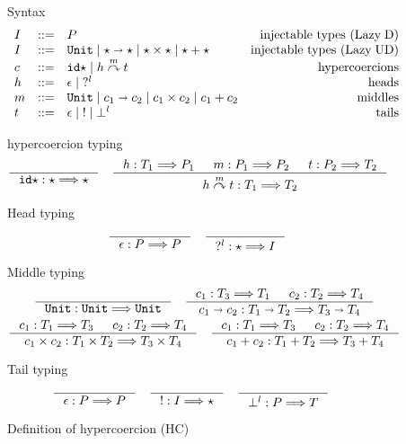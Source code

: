 \documentclass[acmsmall,review,anonymous]{acmart}\settopmatter{printfolios=true,printccs=false,printacmref=false}
\newcommand{\stxrule}[3]{#1 & ::= & #3 & \text{#2}\\}
\newcommand{\plus}[0]{+}
\newcommand{\lazyUD}{Lazy\;UD}
\newcommand{\lazyD}{Lazy\;D}
\newcommand{\TOOdyn}[0]{\star}
\newcommand{\POOunit}[0]{\mathtt{Unit}}
\newcommand{\POOfun}[2]{#1 \shortrightarrow #2}
\newcommand{\POOprod}[2]{#1 \times #2}
\newcommand{\POOsum}[2]{#1 \plus #2}
\newcommand{\typingHC}[3]{#1 : #2 \Longrightarrow #3}
\newcommand{\hyperCoercionI}[0]{\mathtt{id\star}}
\newcommand{\hyperCoercionC}[3]{#1 \overset{#2}{\curvearrowright} #3}
\begin{document}
\begin{figure}
	Syntax
	\[
	\begin{array}{lclr}
	\stxrule{I}{injectable types (\lazyD)}{P}
	\stxrule{I}{injectable types (\lazyUD)}{
		\POOunit \mid
		\POOfun{\TOOdyn}{\TOOdyn} \mid
		\POOprod{\TOOdyn}{\TOOdyn} \mid
		\POOsum{\TOOdyn}{\TOOdyn}
	}
	\stxrule{c}{hypercoercions}{
		\hyperCoercionI \mid{}
		\hyperCoercionC{h}{m}{t}
	}
	\stxrule{h}{heads}{
		\epsilon \mid{}
		?^l
	}
	\stxrule{m}{middles}{
		\POOunit \mid
		\POOfun{c_1}{c_2} \mid
		\POOprod{c_1}{c_2} \mid
		\POOsum{c_1}{c_2}
	}
	\stxrule{t}{tails}{
		\epsilon \mid{}
		! \mid{}
		\bot^l
	}
	\end{array}
	\]
		
	hypercoercion typing 
	\begin{gather*}
	\inference{}{\typingHC{\hyperCoercionI}{\TOOdyn}{\TOOdyn}}
	\quad
	\inference{
		\typingHC{h}{T_1}{P_1} &
		\typingHC{m}{P_1}{P_2} &
		\typingHC{t}{P_2}{T_2}
	}{
		\typingHC{\hyperCoercionC{h}{m}{t}}{T_1}{T_2}
	}
	\end{gather*}
	
	Head typing \fbox{$\typingHC{h}{T}{P}$}
	\begin{gather*}
	\inference{}{\typingHC{\epsilon}{P}{P}}
	\quad
	\inference{}{\typingHC{?^l}{\TOOdyn}{I}}
	\end{gather*}
	
	Middle typing \fbox{$\typingHC{m}{T}{T}$}
	\begin{gather*}
	\inference{}{\typingHC{\POOunit}{\POOunit}{\POOunit}}
	\quad
	\inference{
		\typingHC{c_1}{T_3}{T_1} &
		\typingHC{c_2}{T_2}{T_4}
	}{
		\typingHC{\POOfun{c_1}{c_2}}{\POOfun{T_1}{T_2}}{\POOfun{T_3}{T_4}}
	}
	\\
	\inference{
		\typingHC{c_1}{T_1}{T_3} &
		\typingHC{c_2}{T_2}{T_4}
	}{
		\typingHC{\POOprod{c_1}{c_2}}{\POOprod{T_1}{T_2}}{\POOprod{T_3}{T_4}}
	}
	\quad
	\inference{
		\typingHC{c_1}{T_1}{T_3} &
		\typingHC{c_2}{T_2}{T_4}
	}{
		\typingHC{\POOsum{c_1}{c_2}}{\POOsum{T_1}{T_2}}{\POOsum{T_3}{T_4}}
	}
		\end{gather*}
		
		Tail typing \fbox{$\typingHC{t}{P}{T}$}
		\begin{gather*}
		\inference{}{\typingHC{\epsilon}{P}{P}} \quad
		\inference{}{\typingHC{!}{I}{\TOOdyn}} \quad
		\inference{}{\typingHC{\bot^l}{P}{T}} \quad
		\end{gather*}
	
	\caption{Definition of hypercoercion (HC)}
	\label{fig:hypercoercion}
\end{figure}
\end{document}
